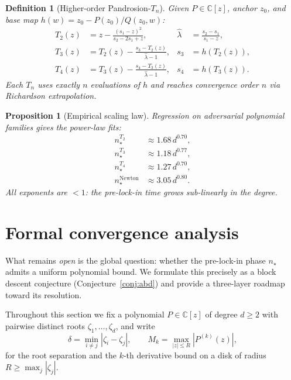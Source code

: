 \documentclass[11pt,a4paper]{article}
\newtheorem{proposition}[theorem]{Proposition}
\newtheorem{definition}[theorem]{Definition}
\begin{document}
\begin{definition}[Higher-order Pandrosion-$T_n$]
Given $P \in \mathbb{C}[z]$, anchor $z_0$, and base map $h(w) = z_0 - P(z_0)/Q(z_0, w)$:
\begin{align}
T_2(z) &= z - \frac{(s_1 - z)^2}{s_2 - 2 s_1 + z}, & \hat\lambda &= \frac{s_2 - s_1}{s_1 - z}, \\
T_3(z) &= T_2(z) - \frac{s_3 - T_2(z)}{\hat\lambda - 1}, & s_3 &= h(T_2(z)), \\
T_4(z) &= T_3(z) - \frac{s_4 - T_3(z)}{\hat\lambda - 1}, & s_4 &= h(T_3(z)).
\end{align}
Each $T_n$ uses exactly $n$ evaluations of $h$ and reaches convergence order $n$ via Richardson extrapolation.
\end{definition}

\begin{proposition}[Empirical scaling law]
Regression on adversarial polynomial families gives the power-law fits:
\begin{align}
n_\star^{T_2} &\approx 1.68\, d^{0.70}, \\
n_\star^{T_3} &\approx 1.18\, d^{0.77}, \\
n_\star^{T_4} &\approx 1.27\, d^{0.70}, \\
n_\star^{\mathrm{Newton}} &\approx 3.05\, d^{0.80}.
\end{align}
All exponents are $< 1$: the pre-lock-in time grows sub-linearly in the degree.
\end{proposition}

\section{Formal convergence analysis}

What remains \emph{open} is the global question: whether the pre-lock-in phase $n_\star$ admits a uniform polynomial bound. We formulate this precisely as a block descent conjecture (Conjecture~\ref{conj:abd}) and provide a three-layer roadmap toward its resolution.

Throughout this section we fix a polynomial $P \in \mathbb{C}[z]$ of degree $d \ge 2$ with pairwise distinct roots $\zeta_1, \dots, \zeta_d$, and write
\begin{equation}
\delta = \min_{i \ne j} |\zeta_i - \zeta_j|, \qquad M_k = \max_{|z| \le R} |P^{(k)}(z)|,
\end{equation}
for the root separation and the $k$-th derivative bound on a disk of radius $R \ge \max_j |\zeta_j|$.
\end{document}

